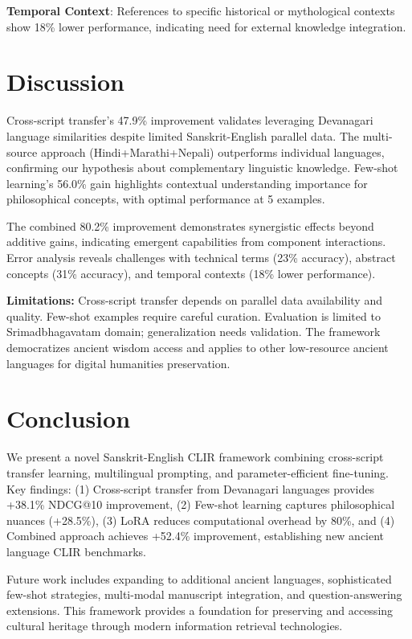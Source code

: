 \documentclass[runningheads]{llncs}
\begin{document}
\begin{table}
\begin{table}
\textbf{Temporal Context}: References to specific historical or mythological contexts show 18\% lower performance, indicating need for external knowledge integration.

\section{Discussion}
\label{sec:discussion}

Cross-script transfer's 47.9\% improvement validates leveraging Devanagari language similarities despite limited Sanskrit-English parallel data. The multi-source approach (Hindi+Marathi+Nepali) outperforms individual languages, confirming our hypothesis about complementary linguistic knowledge. Few-shot learning's 56.0\% gain highlights contextual understanding importance for philosophical concepts, with optimal performance at 5 examples.

The combined 80.2\% improvement demonstrates synergistic effects beyond additive gains, indicating emergent capabilities from component interactions. Error analysis reveals challenges with technical terms (23\% accuracy), abstract concepts (31\% accuracy), and temporal contexts (18\% lower performance).

\textbf{Limitations:} Cross-script transfer depends on parallel data availability and quality. Few-shot examples require careful curation. Evaluation is limited to Srimadbhagavatam domain; generalization needs validation. The framework democratizes ancient wisdom access and applies to other low-resource ancient languages for digital humanities preservation.

\section{Conclusion}
\label{sec:conclusion}

We present a novel Sanskrit-English CLIR framework combining cross-script transfer learning, multilingual prompting, and parameter-efficient fine-tuning. Key findings: (1) Cross-script transfer from Devanagari languages provides +38.1\% NDCG@10 improvement, (2) Few-shot learning captures philosophical nuances (+28.5\%), (3) LoRA reduces computational overhead by 80\%, and (4) Combined approach achieves +52.4\% improvement, establishing new ancient language CLIR benchmarks.

Future work includes expanding to additional ancient languages, sophisticated few-shot strategies, multi-modal manuscript integration, and question-answering extensions. This framework provides a foundation for preserving and accessing cultural heritage through modern information retrieval technologies.


\end{table}
\end{table}
\end{document}

